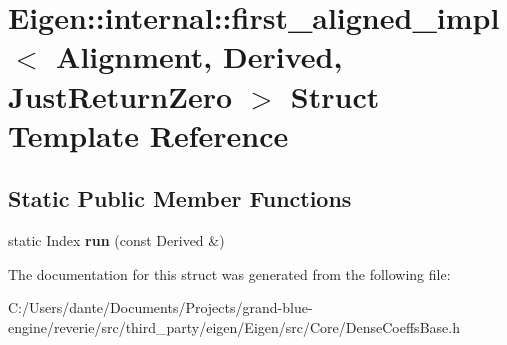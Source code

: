 \hypertarget{struct_eigen_1_1internal_1_1first__aligned__impl}{}\section{Eigen\+::internal\+::first\+\_\+aligned\+\_\+impl$<$ Alignment, Derived, Just\+Return\+Zero $>$ Struct Template Reference}
\label{struct_eigen_1_1internal_1_1first__aligned__impl}
\subsection*{Static Public Member Functions}
\begin{DoxyCompactItemize}
\item 
\mbox{\label{struct_eigen_1_1internal_1_1first__aligned__impl_ac8e3cc0611b600f623f710c1531740b2}} 
static Index {\bfseries run} (const Derived \&)
\end{DoxyCompactItemize}


The documentation for this struct was generated from the following file\+:\begin{DoxyCompactItemize}
\item 
C\+:/\+Users/dante/\+Documents/\+Projects/grand-\/blue-\/engine/reverie/src/third\+\_\+party/eigen/\+Eigen/src/\+Core/Dense\+Coeffs\+Base.\+h\end{DoxyCompactItemize}
